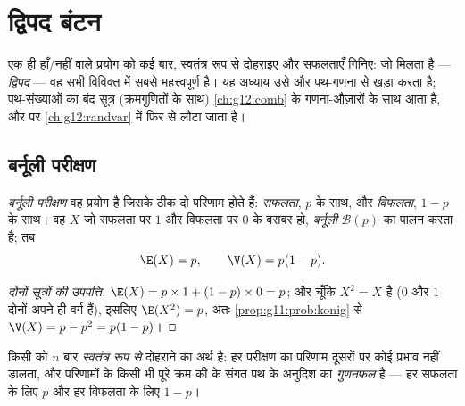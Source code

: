 \chapter{द्विपद बंटन}\label{ch:g11:binom}

एक ही हाँ/नहीं वाले प्रयोग को कई बार, स्वतंत्र रूप से दोहराइए और सफलताएँ
गिनिए: जो  मिलता है --- \emph{द्विपद} --- वह सभी विविक्त  में सबसे
महत्त्वपूर्ण है। यह अध्याय उसे  और पथ-गणना से खड़ा करता है;
पथ-संख्याओं का बंद सूत्र (क्रमगुणितों के साथ) \cref{ch:g12:comb} के गणना-औज़ारों के साथ आता
है, और  पर \cref{ch:g12:randvar} में फिर से लौटा जाता है।

\section{बर्नूली परीक्षण}

\begin{definition}[बर्नूली परीक्षण]\label{def:g11:binom:bernoulli}
\emph{बर्नूली परीक्षण} वह प्रयोग है जिसके ठीक दो
परिणाम होते हैं: \emph{सफलता},  $p$ के साथ, और \emph{विफलता},
 $1 - p$ के साथ। वह  $X$ जो सफलता पर $1$ और विफलता पर $0$
के बराबर हो, \emph{बर्नूली } $\mathcal B(p)$ का पालन करता है; तब
\[
\E(X) = p,
\qquad
\V(X) = p(1 - p).
\]
\end{definition}

\begin{proof}[दोनों सूत्रों की उपपत्ति]
$\E(X) = p \times 1 + (1-p) \times 0 = p$; और चूँकि $X^2 = X$ है ($0$ और $1$ दोनों अपने ही वर्ग हैं), इसलिए $\E(X^2) = p$,
अतः \cref{prop:g11:prob:konig} से $\V(X) = p - p^2 = p(1-p)$।
\end{proof}

\begin{definition}[दोहराए गए स्वतंत्र परीक्षण]\label{def:g11:binom:repeated}
किसी  को $n$ बार \emph{स्वतंत्र रूप से} दोहराने का अर्थ है:
हर परीक्षण का परिणाम दूसरों पर कोई प्रभाव नहीं डालता, और परिणामों के किसी भी
पूरे क्रम की   के संगत पथ के अनुदिश  का
\emph{गुणनफल} है --- हर सफलता के लिए $p$ और हर विफलता के लिए $1 - p$।
\end{definition}

